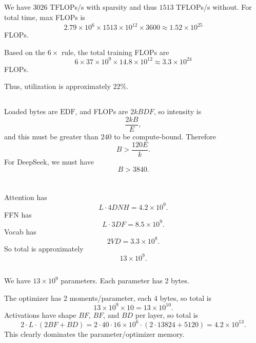 \documentclass[11pt]{article}
\newcommand{\B}{B}
\newcommand{\D}{D}
\newcommand{\F}{F}
\newcommand{\exercisebreak}{\Needspace{8\baselineskip}}
\begin{document}
\exercisebreak
\subsection{}
We have $3026$ TFLOPs/s with sparsity and thus $1513$ TFLOPs/s without. For total time, max FLOPs is
\[
  2.79\times 10^6 \times 1513\times 10^{12}\times 3600
  \approx 1.52\times 10^{25}
\]
FLOPs.

Based on the $6\times$ rule, the total training FLOPs are
\[
  6\times 37\times 10^9 \times 14.8\times 10^{12}
  \approx 3.3\times 10^{24}
\]
FLOPs.

Thus, utilization is approximately $22\%$.

\exercisebreak
\subsection{}
Loaded bytes are $\mathrm{EDF}$, and FLOPs are $2k\B\D\F$, so intensity is
\[
  \frac{2k\B}{E},
\]
and this must be greater than $240$ to be compute-bound. Therefore
\[
  \B > \frac{120E}{k}.
\]
For DeepSeek, we must have
\[
  \B > 3840.
\]

\clearpage
\section{}

\exercisebreak
\subsection{}
Attention has
\[
  L\cdot 4\D N H = 4.2\times 10^9.
\]
FFN has
\[
  L\cdot 3\D\F = 8.5\times 10^9.
\]
Vocab has
\[
  2VD = 3.3\times 10^8.
\]
So total is approximately
\[
  13\times 10^9.
\]

\exercisebreak
\subsection{}
We have $13\times 10^9$ parameters. Each parameter has 2 bytes.

The optimizer has 2 moments/parameter, each 4 bytes, so total is
\[
  13\times 10^9 \times 10 = 13\times 10^{10}.
\]
Activations have shape $BF$, $BF$, and $BD$ per layer, so total is
\[
  2\cdot L\cdot (2BF+BD)
  =
  2\cdot 40\cdot 16\times 10^6\cdot (2\cdot 13824+5120)
  =
  4.2\times 10^{13}.
\]
This clearly dominates the parameter/optimizer memory.

\exercisebreak
\end{document}
